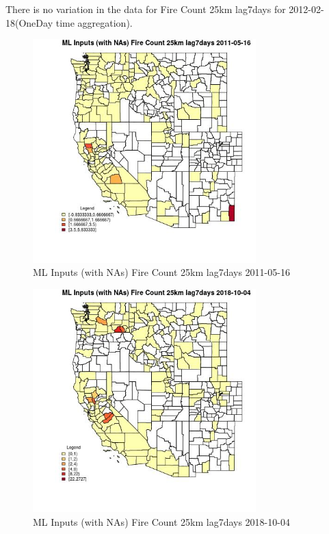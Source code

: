 There is no variation in the data for Fire Count 25km lag7days for 2012-02-18(OneDay time aggregation). 
 

\begin{figure} 
\centering  
\includegraphics[width=0.77\textwidth]{Code_Outputs/Report_ML_input_PM25_Step4_part_f_de_duplicated_aveswNAs_CountyFire_Count_25km_lag7daysMean2011-05-16.jpg} 
\caption{\label{fig:Report_ML_input_PM25_Step4_part_f_de_duplicated_aveswNAsCountyFire_Count_25km_lag7daysMean2011-05-16}ML Inputs (with NAs) Fire Count 25km lag7days 2011-05-16} 
\end{figure} 
 

\begin{figure} 
\centering  
\includegraphics[width=0.77\textwidth]{Code_Outputs/Report_ML_input_PM25_Step4_part_f_de_duplicated_aveswNAs_CountyFire_Count_25km_lag7daysMean2018-10-04.jpg} 
\caption{\label{fig:Report_ML_input_PM25_Step4_part_f_de_duplicated_aveswNAsCountyFire_Count_25km_lag7daysMean2018-10-04}ML Inputs (with NAs) Fire Count 25km lag7days 2018-10-04} 
\end{figure} 
 

